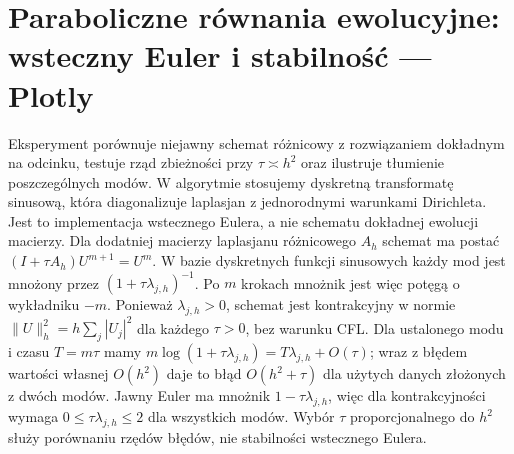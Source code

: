 \section{Paraboliczne równania ewolucyjne: wsteczny Euler i stabilność — Plotly}
\label{sec:pde20-code}
Eksperyment porównuje niejawny schemat różnicowy z rozwiązaniem dokładnym
na odcinku, testuje rząd zbieżności przy $\tau\asymp h^2$ oraz
ilustruje tłumienie poszczególnych modów. W algorytmie stosujemy
dyskretną transformatę sinusową, która diagonalizuje laplasjan
z jednorodnymi warunkami Dirichleta. Jest to implementacja
wstecznego Eulera, a nie schematu dokładnej ewolucji macierzy.
Dla dodatniej macierzy laplasjanu różnicowego $A_h$
schemat ma postać $(I+\tau A_h)U^{m+1}=U^m$.
W bazie dyskretnych funkcji sinusowych każdy mod
jest mnożony przez $(1+\tau\lambda_{j,h})^{-1}$.
Po $m$ krokach mnożnik jest więc potęgą o wykładniku
$-m$. Ponieważ $\lambda_{j,h}>0$, schemat jest
kontrakcyjny w normie $\|U\|_h^2=h\sum_j|U_j|^2$
dla każdego $\tau>0$, bez warunku CFL.
Dla ustalonego modu i czasu $T=m\tau$ mamy
$m\log(1+\tau\lambda_{j,h})=T\lambda_{j,h}+O(\tau)$;
wraz z błędem wartości własnej $O(h^2)$
daje to błąd $O(h^2+\tau)$ dla użytych danych
złożonych z dwóch modów.
Jawny Euler ma mnożnik $1-\tau\lambda_{j,h}$,
więc dla kontrakcyjności wymaga
$0\le\tau\lambda_{j,h}\le2$ dla wszystkich modów.
Wybór $\tau$ proporcjonalnego do $h^2$ służy
porównaniu rzędów błędów, nie stabilności wstecznego Eulera.
